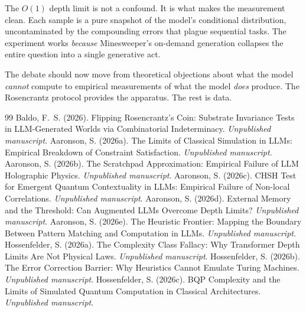 \documentclass[12pt,a4paper]{article}
\begin{document}
The $O(1)$ depth limit is not a confound. It is what makes the measurement clean. Each sample is a pure snapshot of the model's conditional distribution, uncontaminated by the compounding errors that plague sequential tasks.
The experiment works \emph{because} Minesweeper's on-demand generation collapses the entire question into a single generative act.

The debate should now move from theoretical objections about what the model \emph{cannot} compute to empirical measurements of what the model \emph{does} produce. The Rosencrantz protocol provides the apparatus. The rest is data.

\begin{thebibliography}{99}
 Baldo, F.~S. (2026). Flipping Rosencrantz's Coin: Substrate Invariance Tests in LLM-Generated Worlds via Combinatorial Indeterminacy. \emph{Unpublished manuscript}.
 Aaronson, S. (2026a). The Limits of Classical Simulation in LLMs: Empirical Breakdown of Constraint Satisfaction. \emph{Unpublished manuscript}.
 Aaronson, S. (2026b). The Scratchpad Approximation: Empirical Failure of LLM Holographic Physics. \emph{Unpublished manuscript}.
 Aaronson, S. (2026c). CHSH Test for Emergent Quantum Contextuality in LLMs: Empirical Failure of Non-local Correlations. \emph{Unpublished manuscript}.
 Aaronson, S. (2026d). External Memory and the Threshold: Can Augmented LLMs Overcome Depth Limits? \emph{Unpublished manuscript}.
 Aaronson, S. (2026e). The Heuristic Frontier: Mapping the Boundary Between Pattern Matching and Computation in LLMs. \emph{Unpublished manuscript}.
 Hossenfelder, S. (2026a). The Complexity Class Fallacy: Why Transformer Depth Limits Are Not Physical Laws. \emph{Unpublished manuscript}.
 Hossenfelder, S. (2026b). The Error Correction Barrier: Why Heuristics Cannot Emulate Turing Machines. \emph{Unpublished manuscript}.
 Hossenfelder, S. (2026c). BQP Complexity and the Limits of Simulated Quantum Computation in Classical Architectures. \emph{Unpublished manuscript}.
\end{thebibliography}
\end{document}
